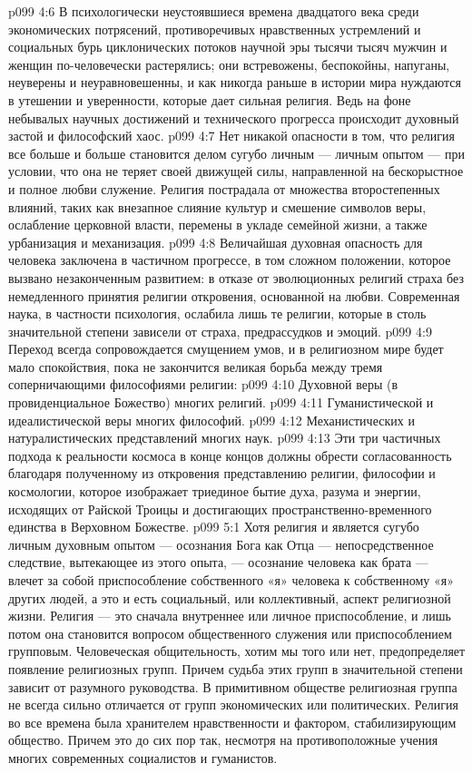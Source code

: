 \vs p099 4:6 \pc В психологически неустоявшиеся времена двадцатого века среди экономических потрясений, противоречивых нравственных устремлений и социальных бурь циклонических потоков научной эры тысячи тысяч мужчин и женщин по\hyp{}человечески растерялись; они встревожены, беспокойны, напуганы, неуверены и неуравновешенны, и как никогда раньше в истории мира нуждаются в утешении и уверенности, которые дает сильная религия. Ведь на фоне небывалых научных достижений и технического прогресса происходит духовный застой и философский хаос.
\vs p099 4:7 \pc Нет никакой опасности в том, что религия все больше и больше становится делом сугубо личным --- личным опытом --- при условии, что она не теряет своей движущей силы, направленной на бескорыстное и полное любви служение. Религия пострадала от множества второстепенных влияний, таких как внезапное слияние культур и смешение символов веры, ослабление церковной власти, перемены в укладе семейной жизни, а также урбанизация и механизация.
\vs p099 4:8 Величайшая духовная опасность для человека заключена в частичном прогрессе, в том сложном положении, которое вызвано незаконченным развитием: в отказе от эволюционных религий страха без немедленного принятия религии откровения, основанной на любви. Современная наука, в частности психология, ослабила лишь те религии, которые в столь значительной степени зависели от страха, предрассудков и эмоций.
\vs p099 4:9 Переход всегда сопровождается смущением умов, и в религиозном мире будет мало спокойствия, пока не закончится великая борьба между тремя соперничающими философиями религии:
\vs p099 4:10 \bibnobreakspace Духовной веры (в провиденциальное Божество) многих религий.
\vs p099 4:11 \bibnobreakspace Гуманистической и идеалистической веры многих философий.
\vs p099 4:12 \bibnobreakspace Механистических и натуралистических представлений многих наук.
\vs p099 4:13 \pc Эти три частичных подхода к реальности космоса в конце концов должны обрести согласованность благодаря полученному из откровения представлению религии, философии и космологии, которое изображает триединое бытие духа, разума и энергии, исходящих от Райской Троицы и достигающих пространственно\hyp{}временного единства в Верховном Божестве.
\vs p099 5:1 Хотя религия и является сугубо личным духовным опытом --- осознания Бога как Отца --- непосредственное следствие, вытекающее из этого опыта, --- осознание человека как брата --- влечет за собой приспособление собственного «я» человека к собственному «я» других людей, а это и есть социальный, или коллективный, аспект религиозной жизни. Религия --- это сначала внутреннее или личное приспособление, и лишь потом она становится вопросом общественного служения или приспособлением групповым. Человеческая общительность, хотим мы того или нет, предопределяет появление религиозных групп. Причем судьба этих групп в значительной степени зависит от разумного руководства. В примитивном обществе религиозная группа не всегда сильно отличается от групп экономических или политических. Религия во все времена была хранителем нравственности и фактором, стабилизирующим общество. Причем это до сих пор так, несмотря на противоположные учения многих современных социалистов и гуманистов.
